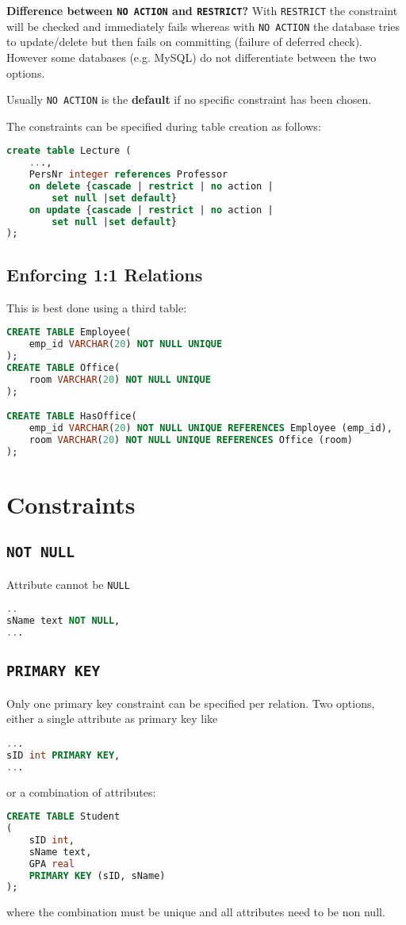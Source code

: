 \documentclass{sciposter}
\renewcommand{\t}[1]{\texttt{#1}}
\begin{document}
\begin{multicols}{3}
\textbf{Difference between \t{NO ACTION} and \t{RESTRICT}?} With \t{RESTRICT} the constraint will be checked and immediately fails whereas with \t{NO ACTION} the database tries to update/delete but then fails on committing (failure of deferred check). However some databases (e.g. MySQL) do not differentiate between the two options.

Usually \t{NO ACTION} is the \textbf{default} if no specific constraint has been chosen.

The constraints can be specified during table creation as follows:

\begin{lstlisting}[language=SQL]
create table Lecture (
	...,
	PersNr integer references Professor
	on delete {cascade | restrict | no action |
		set null |set default}
	on update {cascade | restrict | no action |
		set null |set default}
); 
\end{lstlisting}

\subsection*{Enforcing 1:1 Relations}

This is best done using a third table:
\begin{lstlisting}[language=SQL]
CREATE TABLE Employee(
	emp_id VARCHAR(20) NOT NULL UNIQUE
);
CREATE TABLE Office(
	room VARCHAR(20) NOT NULL UNIQUE
);

CREATE TABLE HasOffice(
	emp_id VARCHAR(20) NOT NULL UNIQUE REFERENCES Employee (emp_id),
	room VARCHAR(20) NOT NULL UNIQUE REFERENCES Office (room)
);
\end{lstlisting}

\section*{Constraints}

\subsection*{\t{NOT NULL}}
Attribute cannot be \t{NULL}
\begin{lstlisting}[language=SQL]
..
sName text NOT NULL,
...

\end{lstlisting}
\subsection*{\t{PRIMARY KEY}}
Only one primary key constraint can be specified per relation.
Two options, either a single attribute as primary key like
\begin{lstlisting}[language=SQL]
...
sID int PRIMARY KEY,
...
\end{lstlisting}
or a combination of attributes:
\begin{lstlisting}[language=SQL]
CREATE TABLE Student
(
	sID int,
	sName text,
	GPA real
	PRIMARY KEY (sID, sName)
);
\end{lstlisting}
where the combination must be unique and all attributes need to be non null.

\end{multicols}
\end{document}
